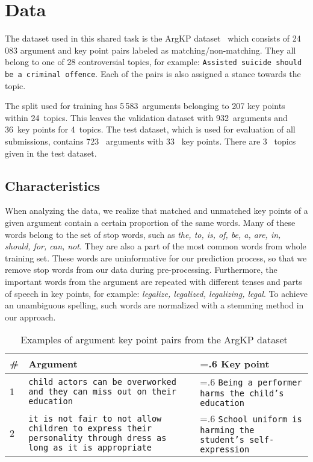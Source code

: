 \section{Data}\label{data}

The dataset used in this shared task is the ArgKP dataset~\cite{Bar-HaimEFKLS2020} which consists of 24\,083 argument and key point pairs labeled as matching/non-matching. They all belong to one of 28 controversial topics, for example: \texttt{Assisted suicide should be a criminal offence}. Each of the pairs is also assigned a stance towards the topic. 

The split used for training has 5\,583~arguments belonging to 207 key points within 24~topics. This leaves the 
validation dataset with 932~arguments and 36~key points for 4~topics. The test dataset, which is used for evaluation of all submissions, contains 723~ arguments with 33~ key points. There are 3~ topics given in the test dataset.

\subsection{Characteristics}
When analyzing the data, we realize that matched and unmatched key points of a given argument contain a certain proportion of the same words. 
Many of these words belong to the set of stop words, such as \textit{the, to, is, of, be, a, are, in, should, for, can, not}. They are also a part of the most common words from whole training set.
These words are uninformative for our prediction process, so that we remove stop words from our data during pre-processing. 
Furthermore, the important words from the argument are repeated with different tenses and parts of speech in key points, for example: \textit{legalize, legalized, legalizing, legal}. 
To achieve an unambiguous spelling, such words are normalized with a stemming method in our approach. 
\begin{table*}
  \caption{Examples of argument key point pairs from the ArgKP dataset~\cite{Bar-HaimEFKLS2020}}
  \label{tab:data-example}
  \begin{tabularx}{\linewidth}{lX>{\hsize=.6\hsize}X}
    \toprule
    \textbf{\#} & \textbf{Argument} & \textbf{Key point} \\
    \midrule
    1 & \texttt{child actors can be overworked and they can miss out on their education} & \texttt{Being a performer harms the child's education} \\
    2 & \texttt{it is not fair to not allow children to express their personality through dress as long as it is appropriate} & \texttt{School uniform is harming the student's self-expression}
  \end{tabularx}
\end{table*}

